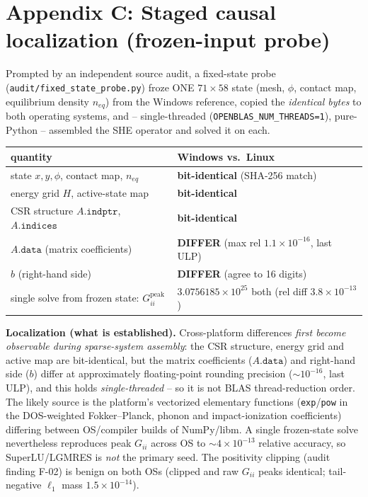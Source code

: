 \documentclass[11pt]{article}
\newcommand{\ten}[1]{\times 10^{#1}}
\begin{document}
\section*{Appendix C: Staged causal localization (frozen-input probe)}
Prompted by an independent source audit, a fixed-state probe (\texttt{audit/fixed\_state\_probe.py}) froze ONE $71\times58$ state (mesh, $\phi$, contact map, equilibrium density $n_{eq}$) from the Windows reference, copied the \emph{identical bytes} to both operating systems, and -- single-threaded (\texttt{OPENBLAS\_NUM\_THREADS=1}), pure-Python -- assembled the SHE operator and solved it on each.
\begin{center}\small
\begin{tabular}{l l}
\toprule
quantity & Windows vs.\ Linux \\
\midrule
state $x,y,\phi$, contact map, $n_{eq}$ & \textbf{bit-identical} (SHA-256 match) \\
energy grid $H$, active-state map & \textbf{bit-identical} \\
CSR structure $A.\mathtt{indptr}$, $A.\mathtt{indices}$ & \textbf{bit-identical} \\
$A.\mathtt{data}$ (matrix coefficients) & \textbf{DIFFER} (max rel $1.1\ten{-16}$, last ULP) \\
$b$ (right-hand side) & \textbf{DIFFER} (agree to 16 digits) \\
single solve from frozen state: $G_{ii}^{\mathrm{peak}}$ & $3.0756185\ten{25}$ both (rel diff $3.8\ten{-13}$) \\
\bottomrule
\end{tabular}
\end{center}
\textbf{Localization (what is established).} Cross-platform differences \emph{first become observable during sparse-system assembly}: the CSR structure, energy grid and active map are bit-identical, but the matrix coefficients ($A.\mathtt{data}$) and right-hand side ($b$) differ at approximately floating-point rounding precision ($\sim10^{-16}$, last ULP), and this holds \emph{single-threaded} -- so it is not BLAS thread-reduction order. The likely source is the platform's vectorized elementary functions (\texttt{exp}/\texttt{pow} in the DOS-weighted Fokker--Planck, phonon and impact-ionization coefficients) differing between OS/compiler builds of NumPy/libm. A single frozen-state solve nevertheless reproduces peak $G_{ii}$ across OS to $\sim4\ten{-13}$ relative accuracy, so SuperLU/LGMRES is \emph{not} the primary seed. The positivity clipping (audit finding F-02) is benign on both OSs (clipped and raw $G_{ii}$ peaks identical; tail-negative $\ell_1$ mass $1.5\ten{-14}$).
\end{document}
